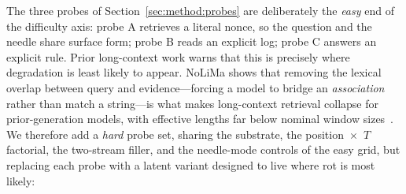 \documentclass[11pt]{article}
\begin{document}
The three probes of Section~\ref{sec:method:probes} are deliberately the \emph{easy} end of the
difficulty axis: probe A retrieves a literal nonce, so the question and the needle share surface
form; probe B reads an explicit log; probe C answers an explicit rule. Prior long-context work
warns that this is precisely where degradation is least likely to appear. NoLiMa shows that
removing the lexical overlap between query and evidence---forcing a model to bridge an
\emph{association} rather than match a string---is what makes long-context retrieval collapse for
prior-generation models, with effective lengths far below nominal window
sizes~\cite{modarressi2025nolima}. We therefore add a \emph{hard} probe set, sharing the substrate,
the position~$\times$~$T$ factorial, the two-stream filler, and the needle-mode controls of the
easy grid, but replacing each probe with a latent variant designed to live where rot is most
likely:
\end{document}
